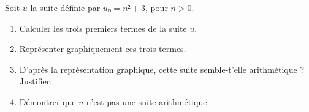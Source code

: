 \documentclass{automatisme}
\begin{document}
\begin{frame}
	Soit $u$ la suite définie par $uₙ = n² + 3$, pour $n > 0$.

	\begin{enumerate}
		\item Calculer les trois premiers termes de la suite $u$.
		\item Représenter graphiquement ces trois termes.
		\item D'après la représentation graphique, cette suite semble-t'elle arithmétique ? Justifier.
		\item Démontrer que $u$ n'est pas une suite arithmétique.
	\end{enumerate}
\end{frame}
\end{document}
